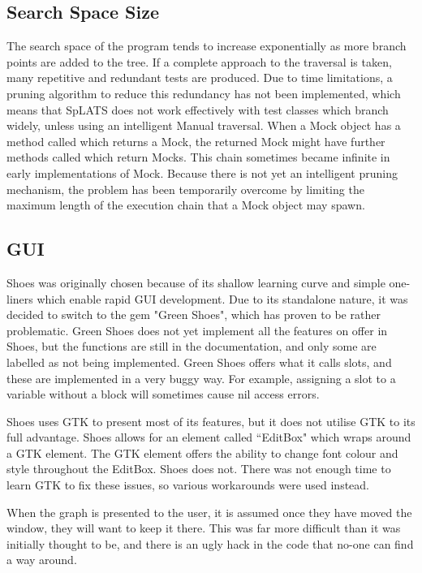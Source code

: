   \subsection{Search Space Size}
    The search space of the program tends to increase exponentially as more branch points are added to the tree. If a complete approach to the traversal is taken, many repetitive and redundant tests are produced. Due to time limitations, a pruning algorithm to reduce this redundancy has not been implemented, which means that SpLATS does not work effectively with test classes which branch widely, unless using an intelligent Manual traversal.
    When a Mock object has a method called which returns a Mock, the returned Mock might have further methods called which return Mocks. This chain sometimes became infinite in early implementations of Mock. Because there is not yet an intelligent pruning mechanism, the problem has been temporarily overcome by limiting the maximum length of the execution chain that a Mock object may spawn.

  \subsection{GUI}
    Shoes was originally chosen because of its shallow learning curve and simple one-liners which enable rapid GUI development. Due to its standalone nature, it was decided to switch to the gem "Green Shoes", which has proven to be rather problematic. Green Shoes does not yet implement all the features on offer in Shoes, but the functions are still in the documentation, and only some are labelled as not being implemented. Green Shoes offers what it calls slots, and these are implemented in a very buggy way. For example, assigning a slot to a variable without a block will sometimes cause nil access errors.
    
    Shoes uses GTK to present most of its features, but it does not utilise GTK to its full advantage. Shoes allows for an element called ``EditBox" which wraps around a GTK element. The GTK element offers the ability to change font colour and style throughout the EditBox. Shoes does not. There was not enough time to learn GTK to fix these issues, so various workarounds were used instead.
    
    When the graph is presented to the user, it is assumed once they have moved the window, they will want to keep it there. This was far more difficult than it was initially thought to be, and there is an ugly hack in the code that no-one can find a way around.
    
